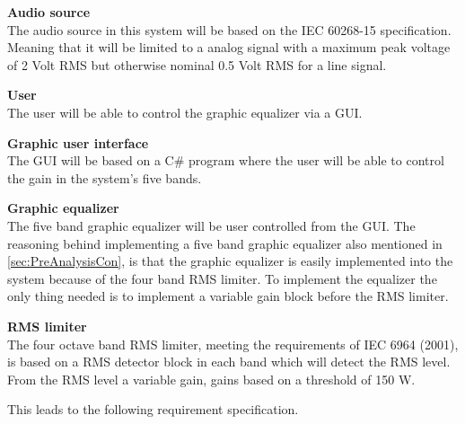 \textbf{Audio source} \\
The audio source in this system will be based on the IEC 60268-15 specification. Meaning that it will be limited to a analog signal with a maximum peak voltage of 2 Volt RMS but otherwise nominal 0.5 Volt RMS for a line signal. %

\textbf{User} \\
The user will be able to control the graphic equalizer via a GUI. 

\textbf{Graphic user interface}\\
The GUI will be based on a C\# program where the user will be able to control the gain in the system's five bands.

\textbf{Graphic equalizer}\\
The five band graphic equalizer will be user controlled from the GUI. The reasoning behind implementing a five band graphic equalizer also mentioned in \autoref{sec:PreAnalysisCon}, is that the graphic equalizer is easily implemented into the system because of the four band RMS limiter. To implement the equalizer the only thing needed is to implement a variable gain block before the RMS limiter.

\textbf{RMS limiter}\\
The four octave band RMS limiter, meeting the requirements of IEC 6964 (2001), is based on a RMS detector block in each band which will detect the RMS level. From the RMS level a variable gain, gains based on a threshold of 150 W. 

This leads to the following requirement specification. 















